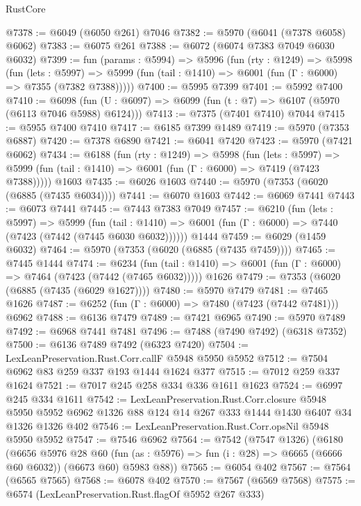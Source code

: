 \begin{lexlean}{RustCore}
\begin{coremodule}
@7378 := @6049 (@6050 @261) @7046
@7382 := @5970 (@6041 (@7378 @6058) @6062)
@7383 := @6075 @261
@7388 := @6072 (@6074 @7383 @7049 @6030 @6032)
@7399 := fun (params : @5994) =>
  @5996
    (fun (rty : @1249) =>
    @5998
      (fun (lets : @5997) =>
      @5999 (fun (tail : @1410) => @6001 (fun (Γ : @6000) => @7355 (@7382 @7388)))))
@7400 := @5995 @7399
@7401 := @5992 @7400
@7410 := @6098 (fun (U : @6097) => @6099 (fun (t : @7) => @6107 (@5970 (@6113 @7046 @5988) @6124)))
@7413 := @7375 (@7401 @7410) @7044
@7415 := @5955 @7400 @7410
@7417 := @6185 @7399 @1489
@7419 := @5970 (@7353 @6887)
@7420 := @7378 @6890
@7421 := @6041 @7420
@7423 := @5970 (@7421 @6062)
@7434 := @6188
    (fun (rty : @1249) =>
    @5998
      (fun (lets : @5997) =>
      @5999 (fun (tail : @1410) => @6001 (fun (Γ : @6000) => @7419 (@7423 @7388)))))
    @1603
@7435 := @6026 @1603
@7440 := @5970 (@7353 (@6020 (@6885 (@7435 @6034))))
@7441 := @6070 @1603
@7442 := @6069 @7441
@7443 := @6073 @7441
@7445 := @7443 @7383 @7049
@7457 := @6210
    (fun (lets : @5997) =>
    @5999
      (fun (tail : @1410) => @6001 (fun (Γ : @6000) => @7440 (@7423 (@7442 (@7445 @6030 @6032))))))
    @1444
@7459 := @6029 (@1459 @6032)
@7464 := @5970 (@7353 (@6020 (@6885 (@7435 @7459))))
@7465 := @7445 @1444
@7474 := @6234
    (fun (tail : @1410) => @6001 (fun (Γ : @6000) => @7464 (@7423 (@7442 (@7465 @6032)))))
    @1626
@7479 := @7353 (@6020 (@6885 (@7435 (@6029 @1627))))
@7480 := @5970 @7479
@7481 := @7465 @1626
@7487 := @6252 (fun (Γ : @6000) => @7480 (@7423 (@7442 @7481))) @6962
@7488 := @6136 @7479
@7489 := @7421 @6965
@7490 := @5970 @7489
@7492 := @6968 @7441 @7481
@7496 := @7488 (@7490 @7492) (@6318 @7352)
@7500 := @6136 @7489 @7492 (@6323 @7420)
@7504 := LexLeanPreservation.Rust.Corr.callF @5948 @5950 @5952
@7512 := @7504 @6962 @83 @259 @337 @193 @1444 @1624 @377
@7515 := @7012 @259 @337 @1624
@7521 := @7017 @245 @258 @334 @336 @1611 @1623
@7524 := @6997 @245 @334 @1611
@7542 := LexLeanPreservation.Rust.Corr.closure
    @5948
    @5950
    @5952
    @6962
    @1326
    @88
    @124
    @14
    @267
    @333
    @1444
    @1430
    @6407
    @34
    @1326
    @1326
    @402
@7546 := LexLeanPreservation.Rust.Corr.opsNil @5948 @5950 @5952
@7547 := @7546 @6962
@7564 := @7542
    (@7547 @1326)
    (@6180
      (@6656
        @5976
        @28
        @60
        (fun (as : @5976) => fun (i : @28) => @6665 (@6666 @60 @6032))
        (@6673 @60)
        @5983
        @88))
@7565 := @6054 @402
@7567 := @7564 (@6565 @7565)
@7568 := @6078 @402
@7570 := @7567 (@6569 @7568)
@7575 := @6574 (LexLeanPreservation.Rust.flagOf @5952 @267 @333)

\end{coremodule}
\end{lexlean}
